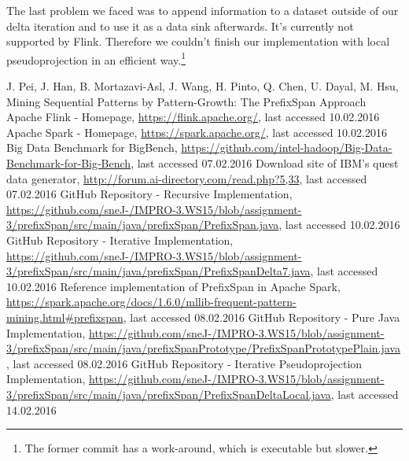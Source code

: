 \documentclass[a4paper,10pt,twocolumn]{article}
\begin{document}
The last problem we faced was to append information to a dataset outside of our delta iteration and to use it as a data sink afterwards. It's currently not supported by Flink. Therefore we couldn't finish our implementation with local pseudoprojection \cite{GithubIterativePseudo} in an efficient way.\footnote{The former commit has a work-around, which is executable but slower.}

\begin{thebibliography}{99}
\raggedright
{} J. Pei, J. Han, B. Mortazavi-Asl, J. Wang, H. Pinto, Q. Chen, U. Dayal, M. Hsu, Mining Sequential Patterns by Pattern-Growth: The PrefixSpan Approach
 Apache Flink - Homepage, \url{https://flink.apache.org/}, last accessed 10.02.2016
 Apache Spark - Homepage, \url{https://spark.apache.org/}, last accessed 10.02.2016
 Big Data Benchmark for BigBench, \url{https://github.com/intel-hadoop/Big-Data-Benchmark-for-Big-Bench}, last accessed 07.02.2016
 Download site of IBM's quest data generator, \url{http://forum.ai-directory.com/read.php?5,33}, last accessed 07.02.2016
 GitHub Repository - Recursive Implementation, \url{https://github.com/sneJ-/IMPRO-3.WS15/blob/assignment-3/prefixSpan/src/main/java/prefixSpan/PrefixSpan.java}, last accessed 10.02.2016
 GitHub Repository - Iterative Implementation, \url{https://github.com/sneJ-/IMPRO-3.WS15/blob/assignment-3/prefixSpan/src/main/java/prefixSpan/PrefixSpanDelta7.java}, last accessed 10.02.2016
 Reference implementation of PrefixSpan in Apache Spark, \url{https://spark.apache.org/docs/1.6.0/mllib-frequent-pattern-mining.html#prefixspan}, last accessed 08.02.2016
 GitHub Repository - Pure Java Implementation, \url{https://github.com/sneJ-/IMPRO-3.WS15/blob/assignment-3/prefixSpan/src/main/java/prefixSpanPrototype/PrefixSpanPrototypePlain.java}, last accessed 08.02.2016
 GitHub Repository - Iterative Pseudoprojection Implementation, \url{https://github.com/sneJ-/IMPRO-3.WS15/blob/assignment-3/prefixSpan/src/main/java/prefixSpan/PrefixSpanDeltaLocal.java}, last accessed 14.02.2016
\end{thebibliography}
\end{document}
